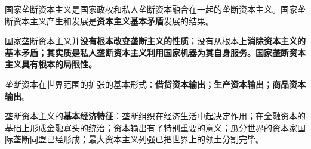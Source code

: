 国家垄断资本主义是国家政权和私人垄断资本融合在一起的垄断资本主义。国家垄断资本主义产生和发展是{\textbf{资本主义基本矛盾}}发展的结果。

国家垄断资本主义并\textbf{{{没有}根本改变垄断主义的性质}}；没有从根本上{\textbf{消除资本主义的基本矛盾}}{\textbf{；{其实质}是私人垄断资本主义利用国家机器为其自身服务。}}{\textbf{国家垄断资本主义具有根本的局限性}}{\textbf{。}}

{垄断资本在世界范围的扩张的基本形式：}{{\textbf{借贷资本输出；生产资本输出；商品资本输出}}}{。}

{垄}{断资本主义的}\textbf{{基本经济特征}}{：垄断组织在经济生活中起决定作用；在金融资本的基础上形成金融寡头的统治；资本输出有了特别重要的意义；瓜分世界的资本家国际垄断同盟已经形成；最大资本主义列强已把世界上的领土分割完毕。}
